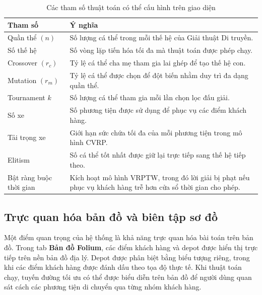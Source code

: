 \documentclass[12pt,a4paper]{article}
\numberwithin{figure}{subsection}
\begin{document}
\begin{table}[H]
    \centering
    \caption{Các tham số thuật toán có thể cấu hình trên giao diện}
    \label{tab:ui_algorithm_parameters}
    \renewcommand{\arraystretch}{1.35}
    \begin{tabular}{|p{4cm}|p{9.8cm}|}
        \hline
        \textbf{Tham số} & \textbf{Ý nghĩa} \\
        \hline
        Quần thể $(n)$ & Số lượng cá thể trong mỗi thế hệ của Giải thuật Di truyền. \\
        \hline
        Số thế hệ & Số vòng lặp tiến hóa tối đa mà thuật toán được phép chạy. \\
        \hline
        Crossover $(r_c)$ & Tỷ lệ cá thể cha mẹ tham gia lai ghép để tạo thế hệ con. \\
        \hline
        Mutation $(r_m)$ & Tỷ lệ cá thể được chọn để đột biến nhằm duy trì đa dạng quần thể. \\
        \hline
        Tournament $k$ & Số lượng cá thể tham gia mỗi lần chọn lọc đấu giải. \\
        \hline
        Số xe & Số phương tiện được sử dụng để phục vụ các điểm khách hàng. \\
        \hline
        Tải trọng xe & Giới hạn sức chứa tối đa của mỗi phương tiện trong mô hình CVRP. \\
        \hline
        Elitism & Số cá thể tốt nhất được giữ lại trực tiếp sang thế hệ tiếp theo. \\
        \hline
        Bật ràng buộc thời gian & Kích hoạt mô hình VRPTW, trong đó lời giải bị phạt nếu phục vụ khách hàng trễ hơn cửa sổ thời gian cho phép. \\
        \hline
    \end{tabular}
\end{table}

\subsection{Trực quan hóa bản đồ và biên tập sơ đồ}

Một điểm quan trọng của hệ thống là khả năng trực quan hóa bài toán trên bản đồ. Trong tab \textbf{Bản đồ Folium}, các điểm khách hàng và depot được hiển thị trực tiếp trên nền bản đồ địa lý. Depot được phân biệt bằng biểu tượng riêng, trong khi các điểm khách hàng được đánh dấu theo tọa độ thực tế. Khi thuật toán chạy, tuyến đường tối ưu có thể được biểu diễn trên bản đồ để người dùng quan sát cách các phương tiện di chuyển qua từng nhóm khách hàng.
\end{document}
